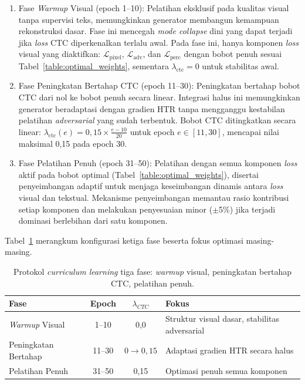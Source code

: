 \begin{enumerate}[label=\alph*., leftmargin=1.5em, labelsep=0.5em, itemindent=0pt, noitemsep, topsep=0pt]
  \item Fase \textit{Warmup} Visual (epoch 1--10): Pelatihan eksklusif pada kualitas visual tanpa supervisi teks, memungkinkan generator membangun kemampuan rekonstruksi dasar. Fase ini mencegah \textit{mode collapse} dini yang dapat terjadi jika \textit{loss} CTC diperkenalkan terlalu awal. Pada fase ini, hanya komponen \textit{loss} visual yang diaktifkan: $\mathcal{L}_{\text{pixel}}$, $\mathcal{L}_{\text{adv}}$, dan $\mathcal{L}_{\text{perc}}$ dengan bobot penuh sesuai Tabel~\ref{table:optimal_weights}, sementara $\lambda_{\text{ctc}}=0$ untuk stabilitas awal.

  \item Fase Peningkatan Bertahap CTC (epoch 11--30): Peningkatan bertahap bobot CTC dari nol ke bobot penuh secara linear. Integrasi halus ini memungkinkan generator beradaptasi dengan gradien HTR tanpa mengganggu kestabilan pelatihan \textit{adversarial} yang sudah terbentuk. Bobot CTC ditingkatkan secara linear: $\lambda_{\text{ctc}}(e) = 0,15 \times \frac{e - 10}{20}$ untuk epoch $e \in [11, 30]$, mencapai nilai maksimal 0,15 pada epoch 30.

  \item Fase Pelatihan Penuh (epoch 31--50): Pelatihan dengan semua komponen \textit{loss} aktif pada bobot optimal (Tabel~\ref{table:optimal_weights}), disertai penyeimbangan adaptif untuk menjaga keseimbangan dinamis antara \textit{loss} visual dan tekstual. Mekanisme penyeimbangan memantau rasio kontribusi setiap komponen dan melakukan penyesuaian minor ($\pm$5\%) jika terjadi dominasi berlebihan dari satu komponen.
\end{enumerate}

Tabel~\ref{tab:curriculum-learning} merangkum konfigurasi ketiga fase beserta fokus optimasi masing-masing.

\begin{table}[H]
  \caption[Protokol \textit{curriculum learning} tiga fase]{Protokol \textit{curriculum learning} tiga fase: \textit{warmup} visual, peningkatan bertahap CTC, pelatihan penuh.}
  \label{tab:curriculum-learning}
  \small

  \footnotesize
  \begin{tabular}{|l|c|c|p{4.5cm}|}
    \hline
    \textbf{Fase}          & \textbf{Epoch} & \textbf{$\lambda_{CTC}$} & \textbf{Fokus}                                \\
    \hline
    \textit{Warmup} Visual & 1--10          & 0,0                      & Struktur visual dasar, stabilitas adversarial \\
    Peningkatan Bertahap   & 11--30         & $0 \to 0,15$             & Adaptasi gradien HTR secara halus             \\
    Pelatihan Penuh        & 31--50         & 0,15                     & Optimasi penuh semua komponen                 \\
    \hline
  \end{tabular}
\end{table}

